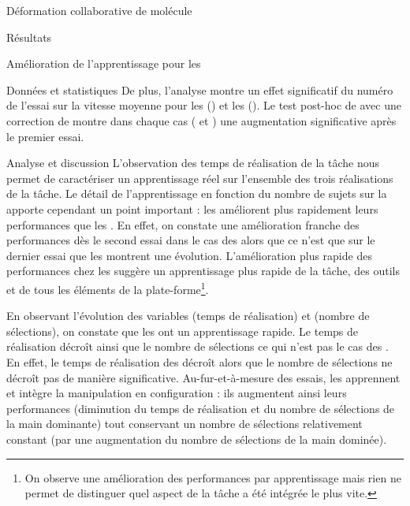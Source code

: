 \documentclass[myfrancais]{mythesis}
\begin{document}
\begin{mychapter}{Déformation collaborative de molécule}
\begin{mysection}{Résultats}
\begin{mysubsection}{Amélioration de l'apprentissage pour les }
\begin{mysubsubsection}{Données et statistiques}
					De plus, l'analyse montre un effet significatif du numéro de l'essai  sur la vitesse moyenne  pour les  () et les  ().
					Le test post-hoc de  avec une correction de  montre dans chaque cas ( et ) une augmentation significative après le premier essai.
				\end{mysubsubsection}
				\begin{mysubsubsection}{Analyse et discussion}
					L'observation des temps de réalisation de la tâche  nous permet de caractériser un apprentissage réel sur l'ensemble des trois réalisations de la tâche.
					Le détail de l'apprentissage en fonction du nombre de sujets sur la  apporte cependant un point important : les  améliorent plus rapidement leurs performances que les .
					En effet, on constate une amélioration franche des performances dès le second essai dans le cas des  alors que ce n'est que sur le dernier essai que les  montrent une évolution.
					L'amélioration plus rapide des performances chez les  suggère un apprentissage plus rapide de la tâche, des outils et de tous les éléments de la plate-forme\footnote{On observe une amélioration des performances par apprentissage mais rien ne permet de distinguer quel aspect de la tâche a été intégrée le plus vite.}.

					En observant l'évolution des variables  (temps de réalisation) et  (nombre de sélections), on constate que les  ont un apprentissage rapide.
					Le temps de réalisation décroît ainsi que le nombre de sélections ce qui n'est pas le cas des .
					En effet, le temps de réalisation des  décroît alors que le nombre de sélections ne décroît pas de manière significative.
					Au-fur-et-à-mesure des essais, les  apprennent et intègre la manipulation en configuration  : ils augmentent ainsi leurs performances (diminution du temps de réalisation et du nombre de sélections de la main dominante) tout conservant un nombre de sélections relativement constant (par une augmentation du nombre de sélections de la main dominée).


\end{mysubsubsection}
\end{mysubsection}
\end{mysection}
\end{mychapter}
\end{document}

